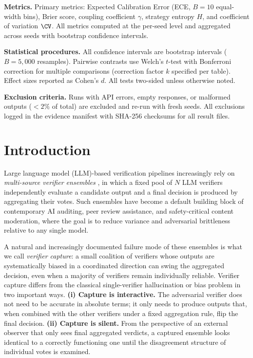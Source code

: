 \documentclass[11pt]{article}
\begin{document}
\textbf{Metrics.} Primary metrics: Expected Calibration Error (ECE, $B{=}10$ equal-width bins), Brier score, coupling coefficient $\gamma$, strategy entropy $H$, and coefficient of variation $\CV$. All metrics computed at the per-seed level and aggregated across seeds with bootstrap confidence intervals.

\textbf{Statistical procedures.} All confidence intervals are bootstrap intervals ($B{=}5{,}000$ resamples). Pairwise contrasts use Welch's $t$-test with Bonferroni correction for multiple comparisons (correction factor $k$ specified per table). Effect sizes reported as Cohen's $d$. All tests two-sided unless otherwise noted.

\textbf{Exclusion criteria.} Runs with API errors, empty responses, or malformed outputs ($<2\%$ of total) are excluded and re-run with fresh seeds. All exclusions logged in the evidence manifest with SHA-256 checksums for all result files.

\section{Introduction}
\label{sec:intro}

Large language model (LLM)-based verification pipelines increasingly rely on
\emph{multi-source verifier ensembles} \citep{cui2026edo,leung2026rubricllm}, in which a fixed pool
of $N$ LLM verifiers independently evaluate a candidate output and a final
decision is produced by aggregating their votes. Such ensembles have become a
default building block of contemporary AI auditing, peer review assistance,
and safety-critical content moderation, where the goal is to reduce variance
and adversarial brittleness relative to any single model.

A natural and increasingly documented failure mode of these ensembles is what
we call \emph{verifier capture}: a small coalition of verifiers whose outputs
are systematically biased in a coordinated direction can swing the aggregated
decision, even when a majority of verifiers remain individually reliable.
Verifier capture differs from the classical single-verifier hallucination or
bias problem in two important ways.
\textbf{(i) Capture is interactive.} The adversarial verifier does not need to
be accurate in absolute terms; it only needs to produce outputs that, when
combined with the other verifiers under a fixed aggregation rule, flip the
final decision.
\textbf{(ii) Capture is silent.} From the perspective of an external observer
that only sees final aggregated verdicts, a captured ensemble looks identical
to a correctly functioning one until the disagreement structure of individual
votes is examined.
\end{document}
